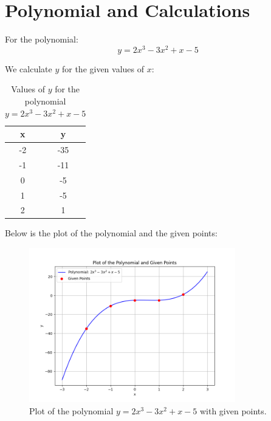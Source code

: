 \section{Polynomial and Calculations}

For the polynomial:
\[
y = 2x^3 - 3x^2 + x - 5
\]

We calculate \( y \) for the given values of \( x \):

\begin{table}[t]
\centering
\begin{tabular}{|c|c|}
\hline
\textbf{x} & \textbf{y} \\
\hline
-2 & -35 \\
-1 & -11 \\
0 & -5 \\
1 & -5 \\
2 & 1 \\
\hline
\end{tabular}
\caption{Values of \( y \) for the polynomial \( y = 2x^3 - 3x^2 + x - 5 \)}
\end{table}

Below is the plot of the polynomial and the given points:

\begin{figure}[t]
\centering
\includegraphics[width=0.8\textwidth]{PART3/1_polynomials/table1_1.png}
\caption{Plot of the polynomial $y = 2x^3 - 3x^2 + x - 5$ with given points.}
\end{figure}